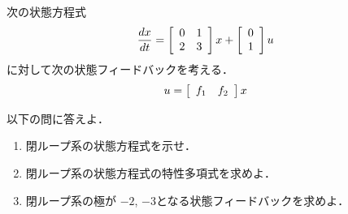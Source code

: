 
\item
次の状態方程式
\begin{align}
	\frac{dx}{dt} 
	& =	\bmatrix{rr}
			0 & 1  \\
			2 & 3
		\ematrix
		x
		+
		\bmatrix{c}
			0 \\
			1
		\ematrix
		u 
\nonumber
\end{align}
に対して次の状態フィードバックを考える．
\begin{align}
	u & = \bmatrix{cc} f_1 & f_2 \ematrix x
\nonumber
\end{align}

以下の問に答えよ．
\begin{enumerate}
\item
閉ループ系の状態方程式を示せ．
\vspace{6cm}

\item
閉ループ系の状態方程式の特性多項式を求めよ．
\vspace{6cm}

\item
閉ループ系の極が $-2$, $-3$となる状態フィードバックを求めよ．
\vspace{6cm}

\end{enumerate}

